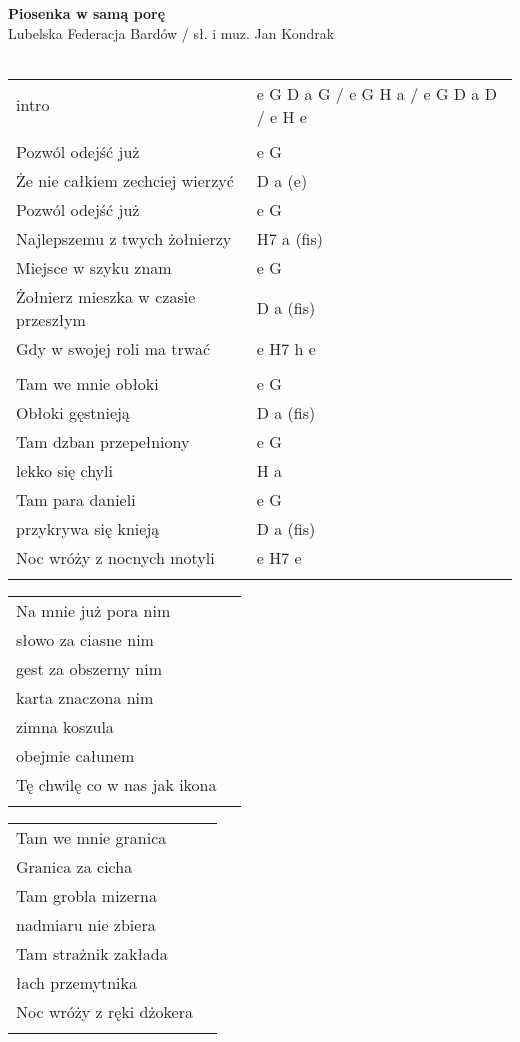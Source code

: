 \documentclass[a5paper]{article}
\begin{document}


\noindent
\fontsize{12pt}{15pt}\selectfont
\textbf{Piosenka w samą porę} \\
\fontsize{8pt}{10pt}\selectfont
Lubelska Federacja Bardów / sł. i muz. Jan Kondrak \\ \\
\fontsize{10pt}{12pt}\selectfont
{}
\begin{tabular}{@{}p{7.00cm}p{3cm}@{}}
\noindent
intro & e G D a G / e G H a / e G D a D / e H e \\ \\
Pozwól odejść już & e G \\
Że nie całkiem zechciej wierzyć & D a (e) \\
Pozwól odejść już & e G\\
Najlepszemu z twych żołnierzy & H7 a (fis)\\
Miejsce w szyku znam & e G \\
Żołnierz mieszka w czasie przeszłym & D a (fis) \\
Gdy w swojej roli ma trwać & e H7 h e \\ \\

Tam we mnie obłoki & e G \\
Obłoki gęstnieją & D a (fis)\\
Tam dzban przepełniony & e G \\
lekko się chyli & H a \\
Tam para danieli & e G \\
przykrywa się knieją & D a (fis) \\
Noc wróży z nocnych motyli  & e H7 e \\ \\
\end{tabular}

\noindent
\begin{tabular}{@{}p{6.00cm}p{3cm}@{}}
Na mnie już pora nim \\
słowo za ciasne nim \\
gest za obszerny nim \\
karta znaczona nim \\
zimna koszula \\
obejmie całunem \\
Tę chwilę co w nas jak ikona \\ \\
\end{tabular}

\noindent
\begin{tabular}{@{}p{6.00cm}p{3cm}@{}}
Tam we mnie granica \\
Granica za cicha \\
Tam grobla mizerna \\
nadmiaru nie zbiera \\
Tam strażnik zakłada \\
łach przemytnika \\
Noc wróży z ręki dżokera \\ \\
\end{tabular}
\end{document}
